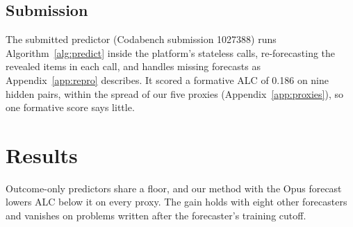 \documentclass{article}
\begin{document}
\subsection{Submission}

The submitted predictor (Codabench submission 1027388) runs Algorithm~\ref{alg:predict} inside the platform's stateless calls, re-forecasting the revealed items in each call, and handles missing forecasts as Appendix~\ref{app:repro} describes. It scored a formative ALC of 0.186 on nine hidden pairs, within the spread of our five proxies (Appendix~\ref{app:proxies}), so one formative score says little.

\section{Results}
\label{sec:results}

Outcome-only predictors share a floor, and our method with the Opus forecast lowers ALC below it on every proxy. The gain holds with eight other forecasters and vanishes on problems written after the forecaster's training cutoff.
\end{document}
